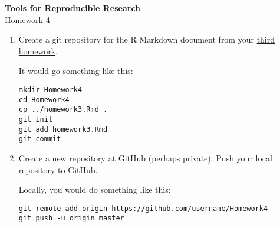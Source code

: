 \documentclass[12pt]{article}
\begin{document}
\thispagestyle{empty}

\textbf{Tools for Reproducible Research} \\
Homework 4

\bigskip

\begin{enumerate}

\item Create a git repository for the R Markdown document from your
  \href{}{third homework}.

It would go something like this:

\vspace{-12pt}

\begin{verbatim}
mkdir Homework4
cd Homework4
cp ../homework3.Rmd .
git init
git add homework3.Rmd
git commit
\end{verbatim}

\item Create a new repository at GitHub (perhaps private). Push your
  local repository to GitHub.

Locally, you would do something like this:

\vspace{-12pt}

\begin{verbatim}
git remote add origin https://github.com/username/Homework4
git push -u origin master
\end{verbatim}

\end{enumerate}
\end{document}
